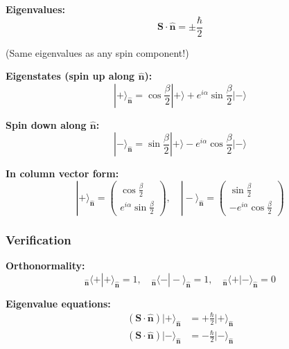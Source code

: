 \documentclass[11pt,a4paper]{article}
\begin{document}
\textbf{Eigenvalues:}
\begin{equation}
\mathbf{S} \cdot \hat{\mathbf{n}} = \pm\frac{\hbar}{2}
\tag{S.27}
\end{equation}

(Same eigenvalues as any spin component!)

\textbf{Eigenstates (spin up along $\hat{\mathbf{n}}$):}
\begin{equation}
\boxed{|+\rangle_{\hat{\mathbf{n}}} = \cos\frac{\beta}{2}|+\rangle + e^{i\alpha}\sin\frac{\beta}{2}|-\rangle}
\tag{S.28}
\end{equation}

\textbf{Spin down along $\hat{\mathbf{n}}$:}
\begin{equation}
\boxed{|-\rangle_{\hat{\mathbf{n}}} = \sin\frac{\beta}{2}|+\rangle - e^{i\alpha}\cos\frac{\beta}{2}|-\rangle}
\tag{S.29}
\end{equation}

\textbf{In column vector form:}
\begin{equation}
|+\rangle_{\hat{\mathbf{n}}} = \begin{pmatrix} \cos\frac{\beta}{2} \\ e^{i\alpha}\sin\frac{\beta}{2} \end{pmatrix}, \quad
|-\rangle_{\hat{\mathbf{n}}} = \begin{pmatrix} \sin\frac{\beta}{2} \\ -e^{i\alpha}\cos\frac{\beta}{2} \end{pmatrix}
\tag{S.30}
\end{equation}

\subsubsection{Verification}

\textbf{Orthonormality:}
\begin{equation}
{}_{\hat{\mathbf{n}}}\langle +|+\rangle_{\hat{\mathbf{n}}} = 1, \quad {}_{\hat{\mathbf{n}}}\langle -|-\rangle_{\hat{\mathbf{n}}} = 1, \quad {}_{\hat{\mathbf{n}}}\langle +|-\rangle_{\hat{\mathbf{n}}} = 0
\tag{S.31}
\end{equation}

\textbf{Eigenvalue equations:}
\begin{align}
(\mathbf{S} \cdot \hat{\mathbf{n}})|+\rangle_{\hat{\mathbf{n}}} &= +\frac{\hbar}{2}|+\rangle_{\hat{\mathbf{n}}} \tag{S.32a} \\
(\mathbf{S} \cdot \hat{\mathbf{n}})|-\rangle_{\hat{\mathbf{n}}} &= -\frac{\hbar}{2}|-\rangle_{\hat{\mathbf{n}}} \tag{S.32b}
\end{align}
\end{document}
